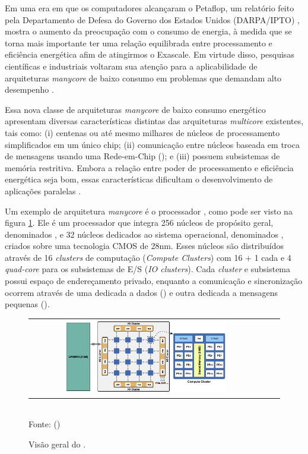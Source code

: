 \documentclass[
	12pt,				%
	openright,			%
	twoside,			%
	a4paper,			%
	english,			%
	brazil,				%
	]{abntex2}
\begin{document}
Em uma era em que os computadores alcançaram o Petaflop, um relatório feito pela Departamento de Defesa do Governo dos Estados Unidos (DARPA/IPTO) \cite{darpa:exascale}, mostra o aumento da preocupação com o consumo de energia, à medida que se torna mais importante ter uma relação equilibrada entre processamento e eficiência energética afim de atingirmos o Exascale. Em virtude disso, pesquisas científicas e industriais voltaram sua atenção para a aplicabilidade de arquiteturas \textit{manycore} de baixo consumo em problemas que demandam alto desempenho \cite{Castro-SBAC-PAD:2014, Castro-PARCO:2016}.

Essa nova classe de arquiteturas \textit{manycore} de baixo consumo energético apresentam diversas características distintas das arquiteturas \textit{multicore} existentes, tais como: (i) centenas ou até mesmo milhares de núcleos de processamento simplificados em um único chip; (ii) comunicação entre núcleos baseada em troca de mensagens usando uma Rede-em-Chip (\noc); e (iii) possuem subsistemas de memória restritiva.
Embora a relação entre poder de processamento e eficiência energética seja bom, essas características dificultam o desenvolvimento de aplicações paralelas \cite{Castro-Souza-CCPE:2016, Castro-PARCO:2016, os:rmen}.

Um exemplo de arquitetura \textit{manycore} é o processador \mppa  \cite{Castro-IA3:2013}, como pode ser visto na figura \ref{figmppa}. Ele é um processador que integra 256 núcleos de propósito geral, denominados \pe, e 32 núcleos dedicados ao sistema operacional, denominados \rman, criados sobre uma tecnologia CMOS de 28nm. Esses núcleos são distribuídos através de 16 \textit{clusters} de computação (\textit{Compute Clusters}) com 16 \pe + 1 \rman cada e 4 \textit{quad-core} para os subsistemas de E/S (\textit{IO clusters}). Cada \textit{cluster} e subsistema possui espaço de endereçamento privado, enquanto a comunicação e sincronização ocorrem através de uma \noc dedicada a dados (\dnoc) e outra dedicada a mensagens pequenas (\cnoc).

\begin{figure}[t]
	\begin{center}
    	\caption{Visão geral do \mppa.}
           \label{figmppa}
		\begin{tabular}{ccc}
			\includegraphics[width=0.7\textwidth]{figs/mppa.png} \\
		\end{tabular}
      \vspace{1ex} \\
      Fonte: ()
     \end{center}
   \vspace{-2ex}
\end{figure}
\end{document}
